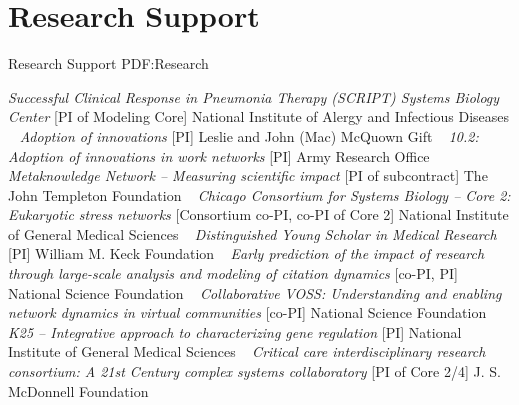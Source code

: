\section
{Research Support}
{Research Support}
{PDF:Research}

\textit{Successful Clinical Response in Pneumonia Therapy (SCRIPT) Systems Biology Center}
    [PI of Modeling Core]
\newline
National Institute of Alergy and Infectious Diseases
\newline
~
\Gap{}
\textit{Adoption of innovations}
    [PI]
\newline
Leslie and John (Mac) McQuown Gift
\newline
~
\Gap{}
\textit{10.2: Adoption of innovations in work networks}
    [PI]
\newline
Army Research Office
\newline
~
\Gap{}
\textit{Metaknowledge Network -- Measuring scientific impact}
    [PI of subcontract]
\newline
The John Templeton Foundation
\newline
~
\Gap{}
\textit{Chicago Consortium for Systems Biology -- Core 2: Eukaryotic stress networks}
    [Consortium co-PI, co-PI of Core 2]
\newline
National Institute of General Medical Sciences
\newline
~
\Gap{}
\textit{Distinguished Young Scholar in Medical Research}
    [PI]
\newline
William M. Keck Foundation
\newline
~
\Gap{}
\textit{Early prediction of the impact of research through large-scale analysis and modeling of citation dynamics}
    [co-PI, PI]
\newline
National Science Foundation 
\newline
~
\Gap{}
\textit{Collaborative VOSS: Understanding and enabling network dynamics in virtual communities}
    [co-PI]
\newline
National Science Foundation 
\newline
~
\Gap{}
\textit{K25 -- Integrative approach to characterizing gene regulation}
    [PI]
\newline
National Institute of General Medical Sciences
\newline
~
\Gap{}
\textit{Critical care interdisciplinary research consortium: A 21st Century complex systems collaboratory}
    [PI of Core 2/4]
\newline
J. S. McDonnell Foundation 
\newline
~
\Gap\vspace*{0.2cm}